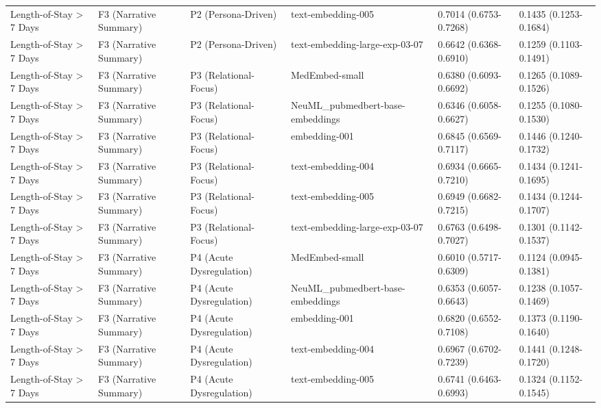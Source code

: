 \documentclass[border=0pt]{standalone}
\begin{document}
\begin{adjustbox}{width=\textwidth}
\begin{tabular}{llllll}
Length-of-Stay \textgreater{} 7 Days & F3 (Narrative Summary) & P2 (Persona-Driven) & text-embedding-005 & 0.7014 (0.6753-0.7268) & 0.1435 (0.1253-0.1684) \\
Length-of-Stay \textgreater{} 7 Days & F3 (Narrative Summary) & P2 (Persona-Driven) & text-embedding-large-exp-03-07 & 0.6642 (0.6368-0.6910) & 0.1259 (0.1103-0.1491) \\
Length-of-Stay \textgreater{} 7 Days & F3 (Narrative Summary) & P3 (Relational-Focus) & MedEmbed-small & 0.6380 (0.6093-0.6692) & 0.1265 (0.1089-0.1526) \\
Length-of-Stay \textgreater{} 7 Days & F3 (Narrative Summary) & P3 (Relational-Focus) & NeuML\_pubmedbert-base-embeddings & 0.6346 (0.6058-0.6627) & 0.1255 (0.1080-0.1530) \\
Length-of-Stay \textgreater{} 7 Days & F3 (Narrative Summary) & P3 (Relational-Focus) & embedding-001 & 0.6845 (0.6569-0.7117) & 0.1446 (0.1240-0.1732) \\
Length-of-Stay \textgreater{} 7 Days & F3 (Narrative Summary) & P3 (Relational-Focus) & text-embedding-004 & 0.6934 (0.6665-0.7210) & 0.1434 (0.1241-0.1695) \\
Length-of-Stay \textgreater{} 7 Days & F3 (Narrative Summary) & P3 (Relational-Focus) & text-embedding-005 & 0.6949 (0.6682-0.7215) & 0.1434 (0.1244-0.1707) \\
Length-of-Stay \textgreater{} 7 Days & F3 (Narrative Summary) & P3 (Relational-Focus) & text-embedding-large-exp-03-07 & 0.6763 (0.6498-0.7027) & 0.1301 (0.1142-0.1537) \\
Length-of-Stay \textgreater{} 7 Days & F3 (Narrative Summary) & P4 (Acute Dysregulation) & MedEmbed-small & 0.6010 (0.5717-0.6309) & 0.1124 (0.0945-0.1381) \\
Length-of-Stay \textgreater{} 7 Days & F3 (Narrative Summary) & P4 (Acute Dysregulation) & NeuML\_pubmedbert-base-embeddings & 0.6353 (0.6057-0.6643) & 0.1238 (0.1057-0.1469) \\
Length-of-Stay \textgreater{} 7 Days & F3 (Narrative Summary) & P4 (Acute Dysregulation) & embedding-001 & 0.6820 (0.6552-0.7108) & 0.1373 (0.1190-0.1640) \\
Length-of-Stay \textgreater{} 7 Days & F3 (Narrative Summary) & P4 (Acute Dysregulation) & text-embedding-004 & 0.6967 (0.6702-0.7239) & 0.1441 (0.1248-0.1720) \\
Length-of-Stay \textgreater{} 7 Days & F3 (Narrative Summary) & P4 (Acute Dysregulation) & text-embedding-005 & 0.6741 (0.6463-0.6993) & 0.1324 (0.1152-0.1545) \\

\end{tabular}
\end{adjustbox}
\end{document}
